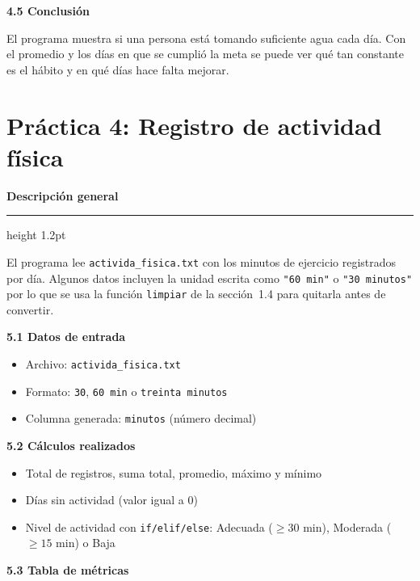 \documentclass[12pt,oneside]{article}
\newcommand{\appheader}[2]{%
  {\large\textbf{\textcolor{#1}{#2}}}%
  \vspace{1mm}\hrule height 1.2pt \vspace{3mm}%
}
\newcommand{\seccion}[1]{%
  \vspace{2mm}%
  \noindent\textbf{#1}%
  \vspace{1mm}%
}
\begin{document}
\seccion{4.5 Conclusión}

El programa muestra si una persona está tomando suficiente agua cada día.
Con el promedio y los días en que se cumplió la meta se puede ver qué tan
constante es el hábito y en qué días hace falta mejorar.

\newpage

\section{Práctica 4: Registro de actividad física}

\appheader{FisicaColor}{Descripción general}

El programa lee \texttt{activida\_fisica.txt} con los minutos de ejercicio registrados por día.
Algunos datos incluyen la unidad escrita como \texttt{"60 min"} o \texttt{"30 minutos"}
por lo que se usa la función \texttt{limpiar} de la sección~1.4 para quitarla antes de convertir.

\seccion{5.1 Datos de entrada}

\begin{itemize}
  \item Archivo: \texttt{activida\_fisica.txt}
  \item Formato: \texttt{30}, \texttt{60 min} o \texttt{treinta minutos}
  \item Columna generada: \texttt{minutos} (número decimal)
\end{itemize}

\seccion{5.2 Cálculos realizados}

\begin{itemize}
  \item Total de registros, suma total, promedio, máximo y mínimo
  \item Días sin actividad (valor igual a $0$)
  \item Nivel de actividad con \texttt{if/elif/else}:
        Adecuada ($\geq 30$ min), Moderada ($\geq 15$ min) o Baja
\end{itemize}

\seccion{5.3 Tabla de métricas}
\end{document}
